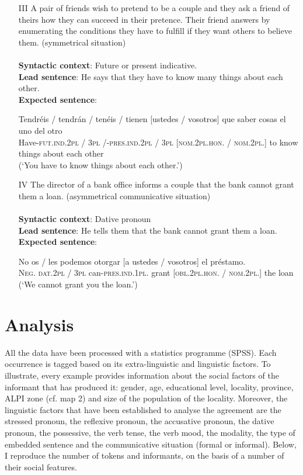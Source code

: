 \documentclass[output=paper]{LSP/langsci}
\begin{document}
\begin{enumerate}
\item [III] A pair of friends wish to pretend to be a couple and they ask a friend of theirs how they can succeed in their pretence. Their friend answers by enumerating the conditions they have to fulfill if they want others to believe them. (symmetrical situation)\\
\\
\textbf{Syntactic context}: Future or present indicative.\\
\textbf{Lead sentence}: He says that they have to know many things about each other.\\ 
\textbf{Expected sentence}:

\ea
\gll
{Tendréis / tendrán / tenéis / tienen}                  {[ustedes / vosotros]} que saber cosas {el uno del otro}\\
{Have-\textsc{fut.ind.2pl / 3pl /-pres.ind.2pl / 3pl}}   {\textsc{[nom.2pl.hon. / nom.2pl.]}} to know things {about each other}\\
\glt (`You have to know things about each other.')\\
\z
 
\item [IV] The director of a bank office informs a couple that the bank cannot grant them a loan. (asymmetrical communicative situation)\\
\\
\textbf{Syntactic context}: Dative pronoun\\
\textbf{Lead sentence}: He tells them that the bank cannot grant them a loan. \\
\textbf{Expected sentence}:

\ea
\gll
No    {os / les}            podemos                otorgar {[a ustedes / vosotros]} el préstamo.\\
{\textsc{Neg.}} {\textsc{dat.2pl / 3pl}} {can-\textsc{pres.ind.1pl.}}  {grant}    {\textsc{[obl.2pl.hon. / nom.2pl.]}} the loan\\
\glt (`We cannot grant you the loan.')
\z

\end{enumerate}

\section{Analysis}
All the data have been processed with a statistics programme (SPSS). Each occurrence is tagged based on its extra-linguistic and linguistic factors. To illustrate, every example provides information about the social factors of the informant that has produced it: gender, age, educational level, locality, province, ALPI zone (cf. map 2) and size of the population of the locality. Moreover, the linguistic factors that have been established to analyse the agreement are the stressed pronoun, the reflexive pronoun, the accusative pronoun, the dative pronoun, the possessive, the verb tense, the verb mood, the modality, the type of embedded sentence and the communicative situation (formal or informal). Below, I reproduce the number of tokens and informants, on the basis of a number of their social features.
\end{document}
